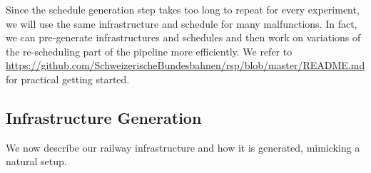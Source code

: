 \documentclass{article}
\begin{document}
Since the schedule generation step takes too long to repeat for every experiment, we will use the same infrastructure and schedule for many malfunctions. In fact, we can pre-generate infrastructures and schedules and then work on variations of the re-scheduling part of the pipeline more efficiently. We refer to \url{https://github.com/SchweizerischeBundesbahnen/rsp/blob/master/README.md} for practical getting started.



\subsection{Infrastructure Generation}\label{subsubsec:infrastructuregeneration}

We now describe our railway infrastructure and how it is generated, mimicking a natural setup.
\end{document}
